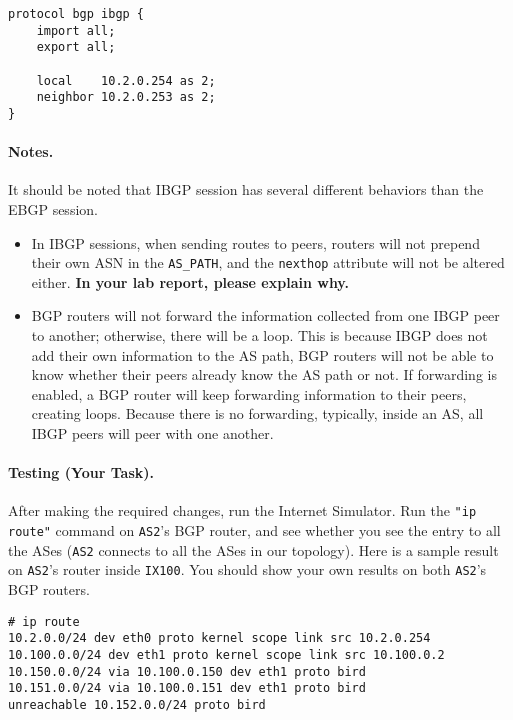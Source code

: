 \begin{lstlisting}
protocol bgp ibgp {
    import all;
    export all;

    local    10.2.0.254 as 2;
    neighbor 10.2.0.253 as 2;
}
\end{lstlisting}
 

\paragraph{Notes.} 
It should be noted that 
IBGP session has several different behaviors than the EBGP session. 
\begin{itemize}
\item In IBGP sessions, when sending routes to peers, 
routers will not prepend their own ASN in the \texttt{AS\_PATH}, 
and the \texttt{nexthop} attribute will not be altered either. 
\textbf{In your lab report, please explain why.} 

\item BGP routers will not forward the information collected 
from one IBGP peer to another; otherwise, there will be a loop. 
This is because IBGP does not add their own information
to the AS path, BGP routers will not be able to know whether 
their peers already know the AS path or not. If forwarding
is enabled, a BGP router will keep forwarding information 
to their peers, creating loops. Because there is no
forwarding, typically, inside an AS, all IBGP peers will 
peer with one another. 
\end{itemize}


\paragraph{Testing (Your Task).}
After making the required changes, run the Internet Simulator. 
Run the \texttt{"ip route"} command on \texttt{AS2}'s
BGP router, and see whether you see the entry
to all the ASes (\texttt{AS2} connects to all the ASes in
our topology). 
Here is a sample result on
\texttt{AS2}'s router inside \texttt{IX100}. You
should show your own results on both \texttt{AS2}'s BGP routers.

\begin{lstlisting}
# ip route
10.2.0.0/24 dev eth0 proto kernel scope link src 10.2.0.254
10.100.0.0/24 dev eth1 proto kernel scope link src 10.100.0.2
10.150.0.0/24 via 10.100.0.150 dev eth1 proto bird
10.151.0.0/24 via 10.100.0.151 dev eth1 proto bird
unreachable 10.152.0.0/24 proto bird
\end{lstlisting}
 
